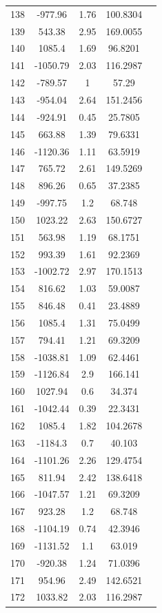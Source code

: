 {\begin{longtable}{ccccc}
138 & -977.96 & 1.76 & 100.8304 \\ 
139 & 543.38 & 2.95 & 169.0055 \\ 
140 & 1085.4 & 1.69 & 96.8201 \\ 
141 & -1050.79 & 2.03 & 116.2987 \\ 
142 & -789.57 & 1 & 57.29 \\ 
143 & -954.04 & 2.64 & 151.2456 \\ 
144 & -924.91 & 0.45 & 25.7805 \\ 
145 & 663.88 & 1.39 & 79.6331 \\ 
146 & -1120.36 & 1.11 & 63.5919 \\ 
147 & 765.72 & 2.61 & 149.5269 \\ 
148 & 896.26 & 0.65 & 37.2385 \\ 
149 & -997.75 & 1.2 & 68.748 \\ 
150 & 1023.22 & 2.63 & 150.6727 \\ 
151 & 563.98 & 1.19 & 68.1751 \\ 
152 & 993.39 & 1.61 & 92.2369 \\ 
153 & -1002.72 & 2.97 & 170.1513 \\ 
154 & 816.62 & 1.03 & 59.0087 \\ 
155 & 846.48 & 0.41 & 23.4889 \\ 
156 & 1085.4 & 1.31 & 75.0499 \\ 
157 & 794.41 & 1.21 & 69.3209 \\ 
158 & -1038.81 & 1.09 & 62.4461 \\ 
159 & -1126.84 & 2.9 & 166.141 \\ 
160 & 1027.94 & 0.6 & 34.374 \\ 
161 & -1042.44 & 0.39 & 22.3431 \\ 
162 & 1085.4 & 1.82 & 104.2678 \\ 
163 & -1184.3 & 0.7 & 40.103 \\ 
164 & -1101.26 & 2.26 & 129.4754 \\ 
165 & 811.94 & 2.42 & 138.6418 \\ 
166 & -1047.57 & 1.21 & 69.3209 \\ 
167 & 923.28 & 1.2 & 68.748 \\ 
168 & -1104.19 & 0.74 & 42.3946 \\ 
169 & -1131.52 & 1.1 & 63.019 \\ 
170 & -920.38 & 1.24 & 71.0396 \\ 
171 & 954.96 & 2.49 & 142.6521 \\ 
172 & 1033.82 & 2.03 & 116.2987 \\ 

\end{longtable}}
